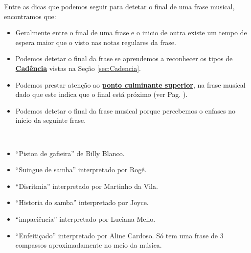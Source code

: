 \label{pos:detetandofinalfrase}
Entre as dicas que podemos seguir para detetar o final de uma frase musical, encontramos que:
\begin{itemize}
\item Geralmente entre o final de uma frase e o inicio de outra  
existe um tempo de espera maior que o visto nas notas regulares da frase.

\item Podemos detetar o final da frase se aprendemos a reconhecer os tipos de \hyperref[sec:Cadencia]{\textbf{Cadência}} 
vistas na Seção \ref{sec:Cadencia}.
\item Podemos prestar atenção ao \hyperref[ref:PontoCulminanteSuperior]{\textbf{ponto culminante superior}},
na frase musical dado que este indica que o final está próximo (ver Pag. \pageref{ref:PontoCulminanteSuperior}).
\item Podemos detetar o final da frase musical porque percebemos o enfases no inicio da seguinte frase.
\end{itemize}


\begin{example} ~
\label{ex:frasesde4compassos}
\begin{itemize}
\item ``Piston de gafieira'' de Billy Blanco.
\item ``Suingue de samba'' interpretado por Rogê.
\item ``Disritmia'' interpretado por Martinho da Vila.
\item ``Historia do samba'' interpretado por Joyce. %
\item ``impaciência'' interpretado por Luciana Mello.
\item ``Enfeitiçado'' interpretado por Aline Cardoso. 
Só tem uma frase de 3 compassos aproximadamente no meio da música.
\end{itemize}
\end{example}

